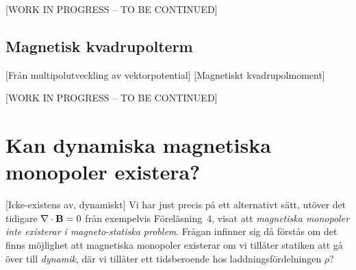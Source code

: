 {{{{{%
\centerline{[WORK IN PROGRESS -- TO BE CONTINUED]}



\subsection{Magnetisk kvadrupolterm}
[Fr{\aa}n multipolutveckling av
  vektorpotential]
[Magnetiskt kvadrupolmoment]

\centerline{[WORK IN PROGRESS -- TO BE CONTINUED]}

\vfill\eject

\section{Kan dynamiska magnetiska monopoler existera?}
[Icke-existens av, dynamiskt]
Vi har just precis p{\aa} ett alternativt s{\"a}tt, ut{\"o}ver det tidigare
$\nabla\cdot{\bf B}=0$ fr{\aa}n exempelvis F{\"o}rel{\"a}sning~4, visat att
{\it magnetiska monopoler inte existerar i magneto-statiska problem}.%
Fr{\aa}gan infinner sig d{\aa} f{\"o}rst{\aa}s om det finns m{\"o}jlighet att
magnetiska monopoler existerar om vi till{\aa}ter statiken att g{\aa} {\"o}ver
till {\it dynamik}, d{\"a}r vi till{\aa}ter ett tidsberoende hos
laddningsf{\"o}rdelningen $\rho$?

}}}}}
